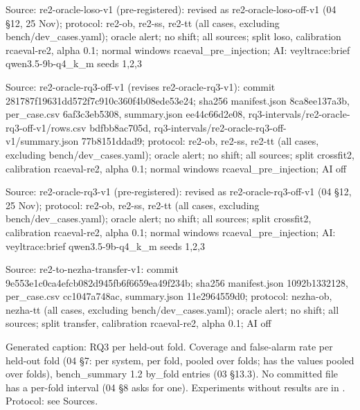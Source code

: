 \noindent Source: re2-oracle-loso-v1 (pre-registered): revised as re2-oracle-loso-off-v1 (04 \S{}12, 25 Nov); protocol: re2-ob, re2-ss, re2-tt (all cases, excluding bench/\allowbreak{}dev\_cases.yaml); oracle alert; no shift; all sources; split loso, calibration rcaeval-re2, alpha 0.1; normal windows rcaeval\_pre\_injection; AI: veyltrace:brief qwen3.5-9b-q4\_k\_m seeds 1,2,3\par
\noindent Source: re2-oracle-rq3-off-v1 (revises re2-oracle-rq3-v1): commit 281787f19631dd572f7c910c360f4b08ede53e24; sha256 manifest.json 8ca8ee137a3b, per\_case.csv 6af3c3eb5308, summary.json ee44c66d2e08, rq3-intervals/\allowbreak{}re2-oracle-rq3-off-v1/\allowbreak{}rows.csv bdfbb8ac705d, rq3-intervals/\allowbreak{}re2-oracle-rq3-off-v1/\allowbreak{}summary.json 77b8151ddad9; protocol: re2-ob, re2-ss, re2-tt (all cases, excluding bench/\allowbreak{}dev\_cases.yaml); oracle alert; no shift; all sources; split crossfit2, calibration rcaeval-re2, alpha 0.1; normal windows rcaeval\_pre\_injection; AI off\par
\noindent Source: re2-oracle-rq3-v1 (pre-registered): revised as re2-oracle-rq3-off-v1 (04 \S{}12, 25 Nov); protocol: re2-ob, re2-ss, re2-tt (all cases, excluding bench/\allowbreak{}dev\_cases.yaml); oracle alert; no shift; all sources; split crossfit2, calibration rcaeval-re2, alpha 0.1; normal windows rcaeval\_pre\_injection; AI: veyltrace:brief qwen3.5-9b-q4\_k\_m seeds 1,2,3\par
\noindent Source: re2-to-nezha-transfer-v1: commit 9e553e1c0ca4efcb082d945fb6f6659ea49f234b; sha256 manifest.json 1092b1332128, per\_case.csv cc1047a748ac, summary.json 11e2964559d0; protocol: nezha-ob, nezha-tt (all cases, excluding bench/\allowbreak{}dev\_cases.yaml); oracle alert; no shift; all sources; split transfer, calibration rcaeval-re2, alpha 0.1; AI off\par
\noindent Generated caption: RQ3 per held-out fold. Coverage and false-alarm rate per held-out fold (04 \S{}7: per system, per fold, pooled over folds;  has the values pooled over folds), bench\_summary 1.2 by\_fold entries (03 \S{}13.3). No committed file has a per-fold interval (04 \S{}8 asks for one). Experiments without results are in . Protocol: see Sources.\par
\endgroup
